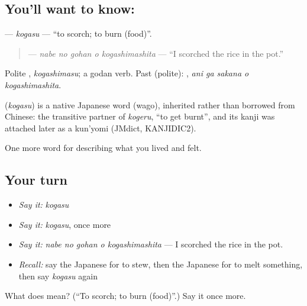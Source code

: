\subsection*{You'll want to know: }
\textbf{} — \emph{kogasu} — \textquotedblleft{}to scorch; to burn (food)\textquotedblright{}.

\begin{quote}
\textbf{  } — \emph{nabe no gohan o kogashimashita} — \textquotedblleft{}I scorched the rice in the pot.\textquotedblright{}
\end{quote}

Polite \textbf{}, \emph{kogashimasu}; a godan verb. Past (polite): \textbf{  }, \emph{ani ga sakana o kogashimashita}.

\begin{cousinweb}
\textbf{} (\emph{kogasu}) is a native Japanese word (wago), inherited rather than borrowed from Chinese: the transitive partner of \emph{kogeru}, \textquotedblleft{}to get burnt\textquotedblright{}, and its kanji was attached later as a kun'yomi (JMdict, KANJIDIC2).
\end{cousinweb}

\begin{grammarlens}[title={What you've built}]
One more word for describing what you lived and felt.
\end{grammarlens}

\subsection*{Your turn}
\begin{itemize}
\raggedright
  \item \emph{Say it:} \emph{kogasu}
  \item \emph{Say it:} \emph{kogasu}, once more
  \item \emph{Say it:} \emph{nabe no gohan o kogashimashita} — I scorched the rice in the pot.
  \item \emph{Recall:} say the Japanese for to stew, then the Japanese for to melt something, then say \emph{kogasu} again
\end{itemize}

\begin{tcolorbox}[breakable,colback=teal!4,colframe=teal!35!black,title={Before you move on}]
What does  mean? (\textquotedblleft{}To scorch; to burn (food)\textquotedblright{}.) Say it once more.
\end{tcolorbox}
